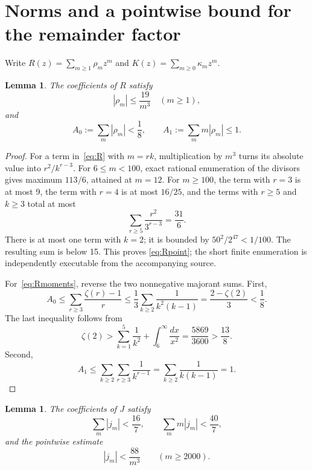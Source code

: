 \documentclass[11pt]{amsart}
\newtheorem{lemma}[theorem]{Lemma}
\theoremstyle{remark}
\begin{document}
\section{Norms and a pointwise bound for the remainder factor}\label{sec:J}

Write \(R(z)=\sum_{m\ge1}\rho_mz^m\) and
\(K(z)=\sum_{m\ge0}\kappa_mz^m\).

\begin{lemma}\label{lem:Rbounds}
The coefficients of \(R\) satisfy
\begin{equation}\label{eq:Rpoint}
 |\rho_m|\le\frac{19}{m^3}\quad(m\ge1),
\end{equation}
and
\begin{equation}\label{eq:Rmoments}
 A_0:=\sum_m|\rho_m|<\frac18,
 \qquad
 A_1:=\sum_m m|\rho_m|\le1.
\end{equation}
\end{lemma}

\begin{proof}
For a term in~\eqref{eq:R} with \(m=rk\), multiplication by \(m^3\)
turns its absolute value into \(r^2/k^{r-3}\). For \(6\le m<100\), exact
rational enumeration of the divisors gives maximum \(113/6\), attained at
\(m=12\). For \(m\ge100\), the term with \(r=3\) is at most 9, the term
with \(r=4\) is at most \(16/25\), and the terms with \(r\ge5\) and
\(k\ge3\) total at most
\[
 \sum_{r\ge5}\frac{r^2}{3^{r-3}}=\frac{31}{6}.
\]
There is at most one term with \(k=2\); it is bounded by
\(50^2/2^{47}<1/100\). The resulting sum is below 15. This proves
\eqref{eq:Rpoint}; the short finite enumeration is independently executable
from the accompanying source.

For~\eqref{eq:Rmoments}, reverse the two nonnegative majorant sums. First,
\[
 A_0\le\sum_{r\ge3}\frac{\zeta(r)-1}{r}
 \le\frac13\sum_{k\ge2}\frac1{k^2(k-1)}
 =\frac{2-\zeta(2)}3<\frac18.
\]
The last inequality follows from
\[
 \zeta(2)>\sum_{k=1}^5\frac1{k^2}
 +\int_6^\infty\frac{dx}{x^2}
 =\frac{5869}{3600}>\frac{13}{8}.
\]
Second,
\[
 A_1\le\sum_{k\ge2}\sum_{r\ge3}\frac1{k^{r-1}}
 =\sum_{k\ge2}\frac1{k(k-1)}=1.
\]
\end{proof}

\begin{lemma}\label{lem:Jbounds}
The coefficients of \(J\) satisfy
\begin{equation}\label{eq:Jmoments}
 \sum_m|j_m|<\frac{16}{7},
 \qquad
 \sum_m m|j_m|<\frac{40}{7},
\end{equation}
and the pointwise estimate
\begin{equation}\label{eq:Jpoint}
 |j_m|<\frac{88}{m^3}\qquad(m\ge2000).
\end{equation}
\end{lemma}
\end{document}
